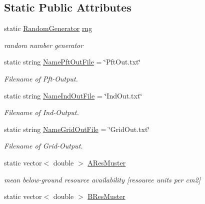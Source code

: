 \subsection*{Static Public Attributes}
\begin{DoxyCompactItemize}
\item 
\mbox{\label{class_c_envir_af8a3ebb5f8193fa7a6878c1103de80b7}} 
static \mbox{\hyperlink{class_random_generator}{Random\+Generator}} \mbox{\hyperlink{class_c_envir_af8a3ebb5f8193fa7a6878c1103de80b7}{rng}}
\begin{DoxyCompactList}\small\item\em random number generator \end{DoxyCompactList}\item 
static string \mbox{\hyperlink{class_c_envir_aabd557ac751d71e57f93b02b429d2386}{Name\+Pft\+Out\+File}} = \char`\"{}Pft\+Out.\+txt\char`\"{}
\begin{DoxyCompactList}\small\item\em Filename of Pft-\/\+Output. \end{DoxyCompactList}\item 
static string \mbox{\hyperlink{class_c_envir_af43d5a1d6cc67cc053a34fb4f2730cfd}{Name\+Ind\+Out\+File}} = \char`\"{}Ind\+Out.\+txt\char`\"{}
\begin{DoxyCompactList}\small\item\em Filename of Ind-\/\+Output. \end{DoxyCompactList}\item 
static string \mbox{\hyperlink{class_c_envir_a6ed76bed8230a347eb5cd456f9d12764}{Name\+Grid\+Out\+File}} = \char`\"{}Grid\+Out.\+txt\char`\"{}
\begin{DoxyCompactList}\small\item\em Filename of Grid-\/\+Output. \end{DoxyCompactList}\item 
static vector$<$ double $>$ \mbox{\hyperlink{class_c_envir_aab3dd27f5abbda28435498855d39e985}{A\+Res\+Muster}}
\begin{DoxyCompactList}\small\item\em mean below-\/ground resource availability \mbox{[}resource units per cm2\mbox{]} \end{DoxyCompactList}\item 
\mbox{\label{class_c_envir_ab634a5c5b528f42035f9bc76afb4161c}} 
static vector$<$ double $>$ \mbox{\hyperlink{class_c_envir_ab634a5c5b528f42035f9bc76afb4161c}{B\+Res\+Muster}}

\end{DoxyCompactItemize}
